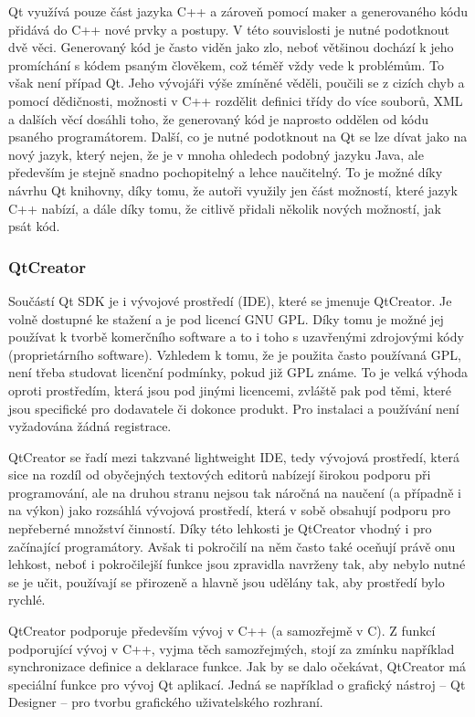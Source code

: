 \documentclass[a4paper,10pt]{article}
\begin{document}
Qt využívá pouze část jazyka C++ a zároveň pomocí maker a generovaného kódu přidává do C++ nové prvky a postupy.
V této souvislosti je nutné podotknout dvě věci.
Generovaný kód je často viděn jako zlo, neboť většinou dochází k jeho promíchání s kódem psaným člověkem, což téměř vždy vede k problémům.
To však není případ Qt.
Jeho vývojáři výše zmíněné věděli, poučili se z cizích chyb a pomocí dědičnosti, možnosti v C++ rozdělit definici třídy do více souborů, XML a dalších věcí dosáhli toho, že generovaný kód je naprosto oddělen od kódu psaného programátorem.
Další, co je nutné podotknout na Qt se lze dívat jako na nový jazyk, který nejen, že je v mnoha ohledech podobný jazyku Java, ale především je stejně snadno pochopitelný a lehce naučitelný.
To je možné díky návrhu Qt knihovny, díky tomu, že autoři využily jen část možností, které jazyk C++ nabízí, a dále díky tomu, že citlivě přidali několik nových možností, jak psát kód.

\subsubsection{QtCreator}
Součástí Qt SDK je i vývojové prostředí (IDE), které se jmenuje QtCreator.
Je volně dostupné ke stažení a je pod licencí GNU GPL.
Díky tomu je možné jej používat k tvorbě komerčního software a to i toho s uzavřenými zdrojovými kódy (proprietárního software).
Vzhledem k tomu, že je použita často používaná GPL, není třeba studovat licenční podmínky, pokud již GPL známe.
To je velká výhoda oproti prostředím, která jsou pod jinými licencemi, zvláště pak pod těmi, které jsou specifické pro dodavatele či dokonce produkt.
Pro instalaci a používání není vyžadována žádná registrace.

QtCreator se řadí mezi takzvané lightweight IDE, tedy vývojová prostředí, která sice na rozdíl od obyčejných textových editorů nabízejí širokou podporu při programování,
ale na druhou stranu nejsou tak náročná na naučení (a případně i na výkon) jako rozsáhlá vývojová prostředí, která v sobě obsahují podporu pro nepřeberné množství činností.
Díky této lehkosti je QtCreator vhodný i pro začínající programátory.
Avšak ti pokročilí na něm často také oceňují právě onu lehkost, neboť i pokročilejší funkce jsou zpravidla navrženy tak,
aby nebylo nutné se je učit, používají se přirozeně a hlavně jsou udělány tak, aby prostředí bylo rychlé.

QtCreator podporuje především vývoj v C++ (a samozřejmě v C).
Z funkcí podporující vývoj v C++, vyjma těch samozřejmých, stojí za zmínku například synchronizace definice a deklarace funkce.
Jak by se dalo očekávat, QtCreator má speciální funkce pro vývoj Qt aplikací.
Jedná se například o grafický nástroj -- Qt Designer -- pro tvorbu grafického uživatelského rozhraní.
\end{document}
